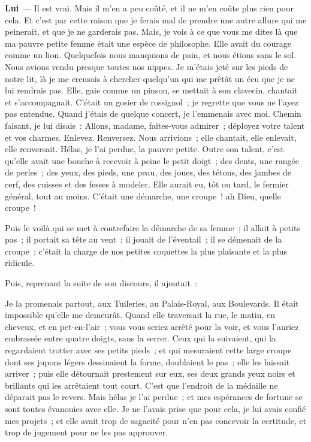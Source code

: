 \documentclass[french,twoside]{book} %
\newcommand{\labelchar}[1]{\textbf{\color{rubric} #1}}
\begin{document}
\labelchar{Lui} — Il est vrai. Mais il m’en a peu coûté, et il ne m’en coûte plus rien pour cela. Et c’est par cette raison que je ferais mal de prendre une autre allure qui me peinerait, et que je ne garderais pas. Mais, je vois à ce que vous me dites là que ma pauvre petite femme était une espèce de philosophe. Elle avait du courage comme un lion. Quelquefois nous manquions de pain, et nous étions sans le sol. Nous avions vendu presque toutes nos nippes. Je m’étais jeté sur les pieds de notre lit, là je me creusais à chercher quelqu’un qui me prêtât un écu que je ne lui rendrais pas. Elle, gaie comme un pinson, se mettait à son clavecin, chantait et s’accompagnait. C’était un gosier de rossignol ; je regrette que vous ne l’ayez pas entendue. Quand j’étais de quelque concert, je l’emmenais avec moi. Chemin faisant, je lui disais : Allons, madame, faites-vous admirer ; déployez votre talent et vos charmes. Enlevez. Renversez. Nous arrivions ; elle chantait, elle enlevait, elle renversait. Hélas, je l’ai perdue, la pauvre petite. Outre son talent, c’est qu’elle avait une bouche à recevoir à peine le petit doigt ; des dents, une rangée de perles ; des yeux, des pieds, une peau, des joues, des tétons, des jambes de cerf, des cuisses et des fesses à modeler. Elle aurait eu, tôt ou tard, le fermier général, tout au moins. C’était une démarche, une croupe ! ah Dieu, quelle croupe !\par
Puis le voilà qui se met à contrefaire la démarche de sa femme ; il allait à petits pas ; il portait sa tête au vent ; il jouait de l’éventail ; il se démenait de la croupe ; c’était la charge de nos petites coquettes la plus plaisante et la plus ridicule.\par
Puis, reprenant la suite de son discours, il ajoutait :\par
Je la promenais partout, aux Tuileries, au Palais-Royal, aux Boulevards. Il était impossible qu’elle me demeurât. Quand elle traversait la rue, le matin, en cheveux, et en pet-en-l’air ; vous vous seriez arrêté pour la voir, et vous l’auriez embrassée entre quatre doigts, sans la serrer. Ceux qui la suivaient, qui la regardaient trotter avec ses petits pieds ; et qui mesuraient cette large croupe dont ses jupons légers dessinaient la forme, doublaient le pas ; elle les laissait arriver ; puis elle détournait prestement sur eux, ses deux grands yeux noirs et brillants qui les arrêtaient tout court. C’est que l’endroit de la médaille ne déparait pas le revers. Mais hélas je l’ai perdue ; et mes espérances de fortune se sont toutes évanouies avec elle. Je ne l’avais prise que pour cela, je lui avais confié mes projets ; et elle avait trop de sagacité pour n’en pas concevoir la certitude, et trop de jugement pour ne les pas approuver.\par
\end{document}
